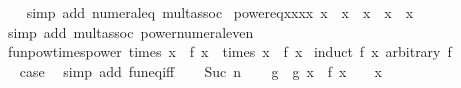 \begin{isabellebody}
%
\isadelimproof
\ \ %
\endisadelimproof
%
\isatagproof
{}\isamarkupfalse%
\ {\isacharparenleft}{\kern0pt}simp\ add{\isacharcolon}{\kern0pt}\ numeral{\isacharunderscore}{\kern0pt}{}{\isacharunderscore}{\kern0pt}eq{\isacharunderscore}{\kern0pt}{}\ mult{\isachardot}{\kern0pt}assoc{\isacharparenright}{\kern0pt}%
\endisatagproof
{\isafoldproof}%
%
\isadelimproof
\isanewline
%
\endisadelimproof
\isanewline
{}\isamarkupfalse%
\ power{}{\isacharunderscore}{\kern0pt}eq{\isacharunderscore}{\kern0pt}xxxx{\isacharcolon}{\kern0pt}\ {\isachardoublequoteopen}x{\isacharcircum}{\kern0pt}{}\ {\isacharequal}{\kern0pt}\ x\ {\isacharasterisk}{\kern0pt}\ x\ {\isacharasterisk}{\kern0pt}\ x\ {\isacharasterisk}{\kern0pt}\ x{\isachardoublequoteclose}\isanewline
%
\isadelimproof
\ \ %
\endisadelimproof
%
\isatagproof
{}\isamarkupfalse%
\ {\isacharparenleft}{\kern0pt}simp\ add{\isacharcolon}{\kern0pt}\ mult{\isachardot}{\kern0pt}assoc\ power{\isacharunderscore}{\kern0pt}numeral{\isacharunderscore}{\kern0pt}even{\isacharparenright}{\kern0pt}%
\endisatagproof
{\isafoldproof}%
%
\isadelimproof
\isanewline
%
\endisadelimproof
\isanewline
{}\isamarkupfalse%
\ funpow{\isacharunderscore}{\kern0pt}times{\isacharunderscore}{\kern0pt}power{\isacharcolon}{\kern0pt}\ {\isachardoublequoteopen}{\isacharparenleft}{\kern0pt}times\ x\ {\isacharcircum}{\kern0pt}{\isacharcircum}{\kern0pt}\ f\ x{\isacharparenright}{\kern0pt}\ {\isacharequal}{\kern0pt}\ times\ {\isacharparenleft}{\kern0pt}x\ {\isacharcircum}{\kern0pt}\ f\ x{\isacharparenright}{\kern0pt}{\isachardoublequoteclose}\isanewline
%
\isadelimproof
%
\endisadelimproof
%
\isatagproof
{}\isamarkupfalse%
\ {\isacharparenleft}{\kern0pt}induct\ {\isachardoublequoteopen}f\ x{\isachardoublequoteclose}\ arbitrary{\isacharcolon}{\kern0pt}\ f{\isacharparenright}{\kern0pt}\isanewline
\ \ \isamarkupfalse%
\ {}\isanewline
\ \ \isamarkupfalse%
\ \isamarkupfalse%
\ {\isacharquery}{\kern0pt}case\ \isamarkupfalse%
\ {\isacharparenleft}{\kern0pt}simp\ add{\isacharcolon}{\kern0pt}\ fun{\isacharunderscore}{\kern0pt}eq{\isacharunderscore}{\kern0pt}iff{\isacharparenright}{\kern0pt}\isanewline
{}\isamarkupfalse%
\isanewline
\ \ \isamarkupfalse%
\ {\isacharparenleft}{\kern0pt}Suc\ n{\isacharparenright}{\kern0pt}\isanewline
\ \ \isamarkupfalse%
\ g\ \ {\isachardoublequoteopen}g\ x\ {\isacharequal}{\kern0pt}\ f\ x\ {\isacharminus}{\kern0pt}\ {}{\isachardoublequoteclose}\ \ x\isanewline

\end{isabellebody}
